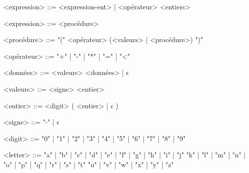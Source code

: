 
	\begin{grammarC}{<expression> ::= <expression-ent> | <opérateur> <entiers>}
		
		<expression> ::= <procédure>
		
		<procédure> ::= "(" <opérateur> (<valeurs> | <procédure>) ")"
				
		<opérateur> ::= "+" | "-" | "*" | "=" | "<" 
		
		<données> ::= <valeurs> <données> | $\epsilon$
		
		<valeurs> ::= <signe> <entier>
		
 		<entier> ::= <digit> ( <entier> | $\epsilon$ )

		<signe> ::= "-" | $\epsilon$ 
		
		<digit> ::= "0" | "1" | "2" | "3" | "4" | "5" | "6" | "7" | "8" | "9"
		
		<letter> ::= "a" | "b" | "c" | "d" | "e" | "f" | "g" | "h" | "i" | "j"
			    \alt "k" | "l" | "m" | "n" | "o" | "p" | "q" | "r" | "s" | "t"
				\alt "u" | "v" | "w" | "x" | "y" | "z"
		
		
	\end{grammarC}

